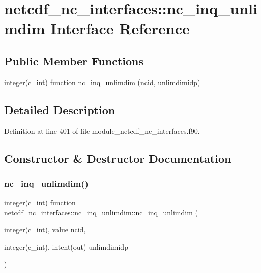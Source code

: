 \hypertarget{interfacenetcdf__nc__interfaces_1_1nc__inq__unlimdim}{}\section{netcdf\+\_\+nc\+\_\+interfaces\+:\+:nc\+\_\+inq\+\_\+unlimdim Interface Reference}
\label{interfacenetcdf__nc__interfaces_1_1nc__inq__unlimdim}
\subsection*{Public Member Functions}
\begin{DoxyCompactItemize}
\item 
integer(c\+\_\+int) function \hyperlink{interfacenetcdf__nc__interfaces_1_1nc__inq__unlimdim_af38b1a7eb064a05b21c4aa9bd746b135}{nc\+\_\+inq\+\_\+unlimdim} (ncid, unlimdimidp)
\end{DoxyCompactItemize}


\subsection{Detailed Description}


Definition at line 401 of file module\+\_\+netcdf\+\_\+nc\+\_\+interfaces.\+f90.



\subsection{Constructor \& Destructor Documentation}
\mbox{\label{interfacenetcdf__nc__interfaces_1_1nc__inq__unlimdim_af38b1a7eb064a05b21c4aa9bd746b135}} 
\subsubsection{\texorpdfstring{nc\+\_\+inq\+\_\+unlimdim()}{nc\_inq\_unlimdim()}}
{\footnotesize\ttfamily integer(c\+\_\+int) function netcdf\+\_\+nc\+\_\+interfaces\+::nc\+\_\+inq\+\_\+unlimdim\+::nc\+\_\+inq\+\_\+unlimdim (\begin{DoxyParamCaption}\item[{integer(c\+\_\+int), value}]{ncid,  }\item[{integer(c\+\_\+int), intent(out)}]{unlimdimidp }\end{DoxyParamCaption})}



